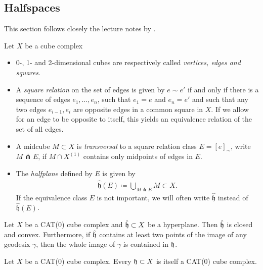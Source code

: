 \subsection{Halfspaces}
\label{sec:halfspaces}

This section follows closely the lecture notes by \textcite{Rolli2012}.

\begin{defin}
  Let \(X\) be a cube complex
  \begin{itemize}
  \item 0-, 1- and 2-dimensional cubes are respectively called \emph{vertices, edges and squares}.
  \item A \emph{square relation} on the set of edges is given by \(e \sim e'\) if and only if there is a sequence of edges \(e_1, \dots, e_n\), such that \(e_1 = e\) and \(e_n = e'\) and such that any two edges \(e_{i-1}, e_i\) are opposite edges in a common square in \(X\). If we allow for an edge to be opposite to itself, this yields an equivalence relation of the set of all edges.
  \item A midcube \(M \subset X\) is \emph{transversal} to a square relation class \(E = [e]_\sim\), write \(M \pitchfork E\), if \(M \cap X^{(1)}\) contains only midpoints of edges in \(E\).
  \item The \emph{halfplane} defined by \(E\) is given by
    \begin{align*}
      \mathfrak{\hat h}(E) \coloneqq \bigcup_{M \pitchfork E} M \subset X.
    \end{align*}
    If the equivalence class \(E\) is not important, we will often write \(\mathfrak{\hat h}\) instead of \(\mathfrak{\hat h}(E)\).
  \end{itemize}
\end{defin}

\begin{prop}
  Let \(X\) be a CAT(0) cube complex and \(\mathfrak{\hat h} \subset X\) be a hyperplane. Then \(\mathfrak{\hat h}\) is closed and convex. Furthermore, if \(\mathfrak{\hat h}\) contains at least two points of the image of any geodesix \(\gamma\), then the whole image of \(\gamma\) is contained in \(\mathfrak{h}\).
\end{prop}

\begin{cor}
  Let \(X\) be a CAT(0) cube complex. Every \(\mathfrak{h} \subset X\) is itself a CAT(0) cube complex.
\end{cor}

